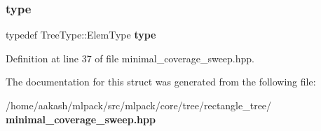 \subsubsection{type}
{\footnotesize\ttfamily typedef Tree\+Type\+::\+Elem\+Type \textbf{ type}}



Definition at line 37 of file minimal\+\_\+coverage\+\_\+sweep.\+hpp.



The documentation for this struct was generated from the following file\+:\begin{DoxyCompactItemize}
\item 
/home/aakash/mlpack/src/mlpack/core/tree/rectangle\+\_\+tree/\textbf{ minimal\+\_\+coverage\+\_\+sweep.\+hpp}\end{DoxyCompactItemize}
